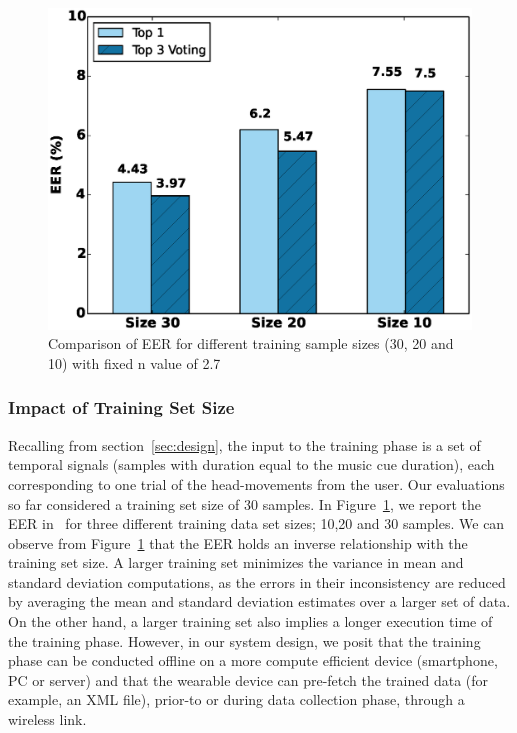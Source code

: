 \begin{figure}[t]
\centering
\includegraphics [width=\columnwidth]{figure/exp2_vary_size.eps}
\caption{Comparison of EER for different training sample sizes (30, 20 and 10) 
with fixed n value of 2.7}
\label{fig:eer-size}
\end{figure}


\subsubsection{Impact of Training Set Size}
Recalling from \systemname section~\ref{sec:design}, the input to the training phase
is a set of temporal signals (samples with duration equal to the music cue 
duration), each corresponding to one trial of the head-movements from the 
user. Our evaluations so far considered a training set size of 30 samples. 
In Figure~\ref{fig:eer-size}, we report the EER in \systemname~for three 
different training data set sizes; 10,20 and 30 samples.
We can observe from Figure~\ref{fig:eer-size} that the EER holds an inverse 
relationship with the training set size. A larger training set minimizes the 
variance in mean and standard deviation computations, as the errors in their 
inconsistency are reduced by averaging the mean and standard deviation 
estimates over a larger set of data. 
On the other hand, a larger training set also implies a longer execution time 
of the training phase.
However, in our system design, we posit that the training phase can be 
conducted 
offline on a more compute efficient device (smartphone, PC or server) and that 
the wearable device can pre-fetch the trained data (for example, an XML file), 
prior-to or during data collection phase, through a wireless link. 
